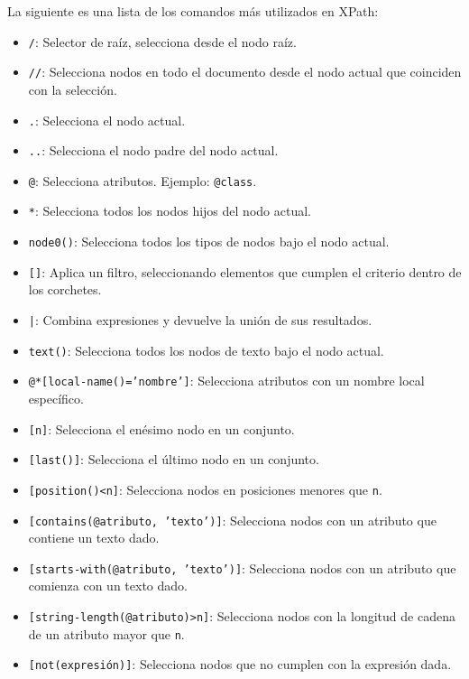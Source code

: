         La siguiente es una lista de los comandos más utilizados en XPath:

        \begin{itemize}
            \item \texttt{/}: Selector de raíz, selecciona desde el nodo raíz.
            \item \texttt{//}: Selecciona nodos en todo el documento desde el nodo actual que coinciden con la selección.
            \item \texttt{.}: Selecciona el nodo actual.
            \item \texttt{..}: Selecciona el nodo padre del nodo actual.
            \item \texttt{@}: Selecciona atributos. Ejemplo: \texttt{@class}.
            \item \texttt{*}: Selecciona todos los nodos hijos del nodo actual.
            \item \texttt{node0()}: Selecciona todos los tipos de nodos bajo el nodo actual.
            \item \texttt{[]}: Aplica un filtro, seleccionando elementos que cumplen el criterio dentro de los corchetes.
            \item \texttt{|}: Combina expresiones y devuelve la unión de sus resultados.
            \item \texttt{text()}: Selecciona todos los nodos de texto bajo el nodo actual.
            \item \texttt{@*[local-name()='nombre']}: Selecciona atributos con un nombre local específico.
            \item \texttt{[n]}: Selecciona el enésimo nodo en un conjunto.
            \item \texttt{[last()]}: Selecciona el último nodo en un conjunto.
            \item \texttt{[position()<n]}: Selecciona nodos en posiciones menores que \texttt{n}.
            \item \texttt{[contains(@atributo, 'texto')]}: Selecciona nodos con un atributo que contiene un texto dado.
            \item \texttt{[starts-with(@atributo, 'texto')]}: Selecciona nodos con un atributo que comienza con un texto dado.
            \item \texttt{[string-length(@atributo)>n]}: Selecciona nodos con la longitud de cadena de un atributo mayor que \texttt{n}.
            \item \texttt{[not(expresión)]}: Selecciona nodos que no cumplen con la expresión dada.
        \end{itemize}

